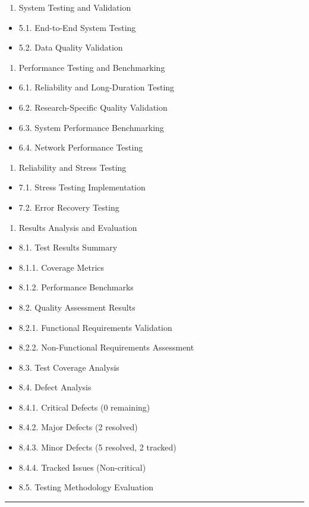 \documentclass[12pt,a4paper]{report}
\begin{document}
\begin{enumerate}
\item System Testing and Validation
\end{enumerate}
\begin{itemize}
\item 5.1. End-to-End System Testing
\item 5.2. Data Quality Validation
\end{itemize}
\begin{enumerate}
\item Performance Testing and Benchmarking
\end{enumerate}
\begin{itemize}
\item 6.1. Reliability and Long-Duration Testing
\item 6.2. Research-Specific Quality Validation
\item 6.3. System Performance Benchmarking
\item 6.4. Network Performance Testing
\end{itemize}
\begin{enumerate}
\item Reliability and Stress Testing
\end{enumerate}
\begin{itemize}
\item 7.1. Stress Testing Implementation
\item 7.2. Error Recovery Testing
\end{itemize}
\begin{enumerate}
\item Results Analysis and Evaluation
\end{enumerate}
\begin{itemize}
\item 8.1. Test Results Summary
\item 8.1.1. Coverage Metrics
\item 8.1.2. Performance Benchmarks
\item 8.2. Quality Assessment Results
\item 8.2.1. Functional Requirements Validation
\item 8.2.2. Non-Functional Requirements Assessment
\item 8.3. Test Coverage Analysis
\item 8.4. Defect Analysis
\item 8.4.1. Critical Defects (0 remaining)
\item 8.4.2. Major Defects (2 resolved)
\item 8.4.3. Minor Defects (5 resolved, 2 tracked)
\item 8.4.4. Tracked Issues (Non-critical)
\item 8.5. Testing Methodology Evaluation

\end{itemize}
\hrule
\end{document}
